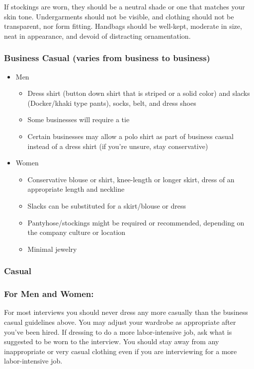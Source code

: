 \begin{itemize}[leftmargin=1.0cm]
\begin{itemize}
		            If stockings are worn, they should be a neutral shade or one that matches your skin tone. Undergarments should not be visible, and clothing should not be transparent, nor form fitting. Handbags should be well-kept, moderate in size, neat in appearance, and devoid of distracting ornamentation.
	      \end{itemize}\end{itemize}
\subsubsection*{Business Casual (varies from business to business) }
\begin{itemize}[leftmargin=1.0cm]
	\item Men
	      \begin{itemize}
		      \item Dress shirt (button down shirt that is striped or a solid color) and slacks (Docker/khaki type pants), socks, belt, and dress shoes
		      \item Some businesses will require a tie
		      \item Certain businesses may allow a polo shirt as part of business casual instead of a dress shirt (if you're unsure, stay conservative)
	      \end{itemize}
	\item Women
	      \begin{itemize}
		      \item Conservative blouse or shirt, knee-length or longer skirt, dress of an appropriate length and neckline
		      \item Slacks can be substituted for a skirt/blouse or dress
		      \item Pantyhose/stockings might be required or recommended, depending on the company culture or location
		      \item Minimal jewelry
	      \end{itemize}\end{itemize}
\subsubsection*{Casual}

\subsubsection*{For Men and Women:}
\break For most interviews you should never dress any more casually than the business casual guidelines above. You may adjust your wardrobe as appropriate after you've been hired. If dressing to do a more labor-intensive job, ask what is suggested to be worn to the interview. You should stay away from any inappropriate or very casual clothing even if you are interviewing for a more labor-intensive job.

